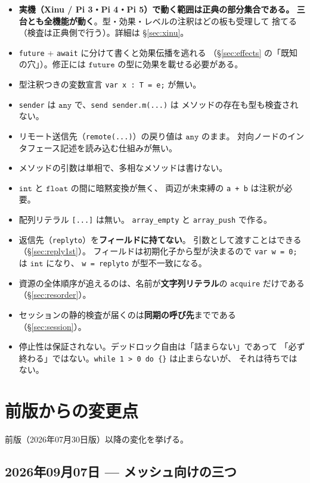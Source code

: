 \documentclass[11pt,a4paper]{ltjsarticle}
\newcommand{\ty}[1]{\ensuremath{\mathtt{#1}}}
\begin{document}
\begin{itemize}
\item \textbf{実機（Xinu / Pi 3・Pi 4・Pi 5）で動く範囲は正典の部分集合である。}
  \textbf{三台とも全機能が動く}。型・効果・レベルの注釈はどの板も受理して
  捨てる（検査は正典側で行う）。詳細は \S\ref{sec:xinu}。
\item \texttt{future} + \texttt{await} に分けて書くと効果伝播を逃れる
  （\S\ref{sec:effects} の「既知の穴」）。修正には
  \ty{future} の型に効果を載せる必要がある。
\item 型注釈つきの変数宣言 \texttt{var x : T = e;} が無い。
\item \texttt{sender} は \ty{any} で、\texttt{send sender.m(...)} は
  メソッドの存在も型も検査されない。
\item リモート送信先（\texttt{remote(...)}）の戻り値は \ty{any} のまま。
  対向ノードのインタフェース記述を読み込む仕組みが無い。
\item メソッドの引数は単相で、多相なメソッドは書けない。
\item \ty{int} と \ty{float} の間に暗黙変換が無く、
  両辺が未束縛の \texttt{a + b} は注釈が必要。
\item 配列リテラル \texttt{[...]} は無い。
  \texttt{array\_empty} と \texttt{array\_push} で作る。
\item 返信先（\texttt{replyto}）を\textbf{フィールドに持てない}。
  引数として渡すことはできる（\S\ref{sec:reply1st}）。
  フィールドは初期化子から型が決まるので \texttt{var w = 0;} は \ty{int} になり、
  \texttt{w = replyto} が型不一致になる。
\item 資源の全体順序が追えるのは、名前が\textbf{文字列リテラル}の
  \texttt{acquire} だけである（\S\ref{sec:resorder}）。
\item セッションの静的検査が届くのは\textbf{同期の呼び先}までである
  （\S\ref{sec:session}）。
\item 停止性は保証されない。デッドロック自由は「詰まらない」であって
  「必ず終わる」ではない。\texttt{while 1 > 0 do \{\}} は止まらないが、
  それは待ちではない。
\end{itemize}

\section{前版からの変更点}
\label{sec:migrate}

前版（2026年07月30日版）以降の変化を挙げる。

\subsection{2026年09月07日 --- メッシュ向けの三つ}
\end{document}
